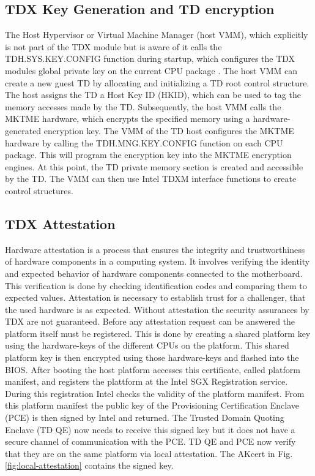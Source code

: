 \subsection{TDX Key Generation and TD encryption}
The Host Hypervisor or Virtual Machine Manager (host VMM), which explicitly is not part of the TDX module but is aware of it calls the TDH.SYS.KEY.CONFIG function during startup, which configures the TDX modules global private key on the current CPU package \cite{intel_corporation_intel-tdx-module-15-abi-spec-348551001pdf_2024}.  The host VMM can create a new guest TD by allocating and initializing a TD root control structure. The host assigns the TD a Host Key ID (HKID), which can be used to tag the memory accesses made by the TD\cite{noauthor_tdx-module-10-public-specpdf_nodate}. Subsequently, the host VMM calls the MKTME hardware, which encrypts the specified memory using a hardware-generated encryption key\cite{noauthor_multi-key-total-memory-encryption-spec-14pdf_nodate}. The VMM of the TD host configures the MKTME hardware by calling the TDH.MNG.KEY.CONFIG function on each CPU package. This will program the encryption key into the MKTME encryption engines\cite{noauthor_tdx-module-10-public-specpdf_nodate}. At this point, the TD private memory section is created and accessible by the TD. The VMM can then use Intel TDXM interface functions to create control structures. 
\subsection{TDX Attestation}
\label{TDX attestation}
Hardware attestation is a process that ensures the integrity and trustworthiness of hardware components in a computing system. It involves verifying the identity and expected behavior of hardware components connected to the motherboard. This verification is done by checking identification codes and comparing them to expected values. Attestation is necessary to establish trust for a challenger, that the used hardware is as expected. Without attestation the security assurances by TDX are not guaranteed. 
\label{Pre-Attestation setup}
Before any attestation request can be answered the platform itself must be registered. This is done by creating a shared platform key using the hardware-keys of the different CPUs on the platform. This shared platform key is then encrypted using those hardware-keys and flashed into the BIOS. After booting the host platform accesses this certificate, called platform manifest, and registers the plattform at the Intel SGX Registration service. During this registration Intel checks the validity of the platform manifest. From this platform manifest the public key of the Provisioning Certification Enclave (PCE) is then signed by Intel and returned. The Trusted Domain Quoting Enclave (TD QE) now needs to receive this signed key but it does not have a secure channel of communication with the PCE. TD QE and PCE now verify that they are on the same platform via local attestation. The AKcert in Fig. \ref{fig:local-attestation} contains the signed key. 

